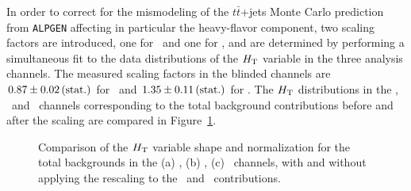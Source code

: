 In order to correct for the mismodeling of the $t\bar{t}$+jets 
Monte Carlo prediction from \texttt{ALPGEN} affecting in
particular the heavy-flavor component, two scaling factors are
introduced, one for \ttlf\ and one for \tthf, and are determined
by performing a simultaneous fit to the data distributions
of the $\HT$  variable in the three analysis channels. 
The measured scaling factors in the blinded channels are 
$0.87 \pm 0.02\,{\rm (stat.)}$ for \ttlf\ and 
$1.35 \pm 0.11\,{\rm (stat.)}$ for \tthf.
The $\HT$ distributions in the \chii, \chiii\ and \chiv\ 
channels corresponding to the total background contributions
before and after the scaling are compared in Figure~\ref{fig:htcomp}.
\begin{figure}[htb]\begin{center}
	\caption{Comparison of the  $\HT$  variable shape and normalization for the
        total backgrounds in the (a) \chii, (b) \chiii, (c) \chiv\ channels, with and
        without applying the rescaling to the \ttlf\ and \tthf\ contributions. \label{fig:htcomp}}
\end{center}\end{figure}
